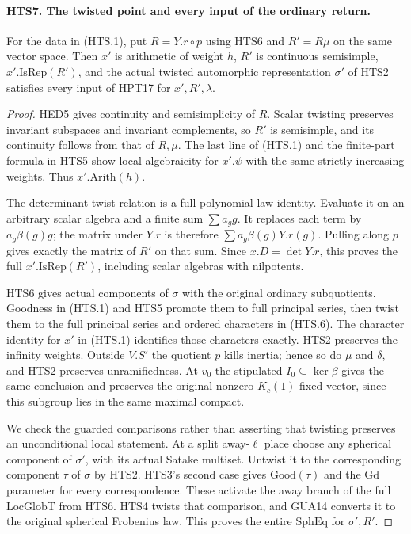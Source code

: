 \paragraph{HTS7. The twisted point and every input of the ordinary return.}
\label{claim:HTS7}
For the data in (HTS.1), put $R=Y.r\circ p$ using HTS6 and
$R'=R\mu$ on the same vector space.  Then $x'$ is arithmetic
of weight $h$, $R'$ is continuous semisimple,
$x'.\mathrm{IsRep}(R')$, and the actual twisted automorphic
representation $\sigma'$ of HTS2 satisfies every input of HPT17
for $x',R',\lambda$.
\begin{proof}
HED5 gives continuity and semisimplicity of $R$.  Scalar twisting
preserves invariant subspaces and invariant complements, so
$R'$ is semisimple, and its continuity follows from that of
$R,\mu$.  The last line of (HTS.1) and the finite-part formula
in HTS5 show local algebraicity for $x'.\psi$ with the same
strictly increasing weights.  Thus $x'.\mathrm{Arith}(h)$.

The determinant twist relation is a full polynomial-law identity.
Evaluate it on an arbitrary scalar algebra and a finite sum
$\sum a_g g$.  It replaces each term by
$a_g\beta(g)g$; the matrix under $Y.r$ is therefore
$\sum a_g\beta(g)Y.r(g)$.  Pulling along $p$ gives exactly
the matrix of $R'$ on that sum.  Since $x.D=\det Y.r$,
this proves the full $x'.\mathrm{IsRep}(R')$, including scalar
algebras with nilpotents.

HTS6 gives actual components of $\sigma$ with the original
ordinary subquotients.  Goodness in (HTS.1) and HTS5 promote
them to full principal series, then twist them to the full
principal series and ordered characters in (HTS.6).  The
character identity for $x'$ in (HTS.1) identifies those characters
exactly.  HTS2 preserves the infinity weights.  Outside $V.S'$
the quotient $p$ kills inertia; hence so do $\mu$ and $\delta$,
and HTS2 preserves unramifiedness.  At $v_0$ the stipulated
$I_0\subseteq\ker\beta$ gives the same conclusion and preserves
the original nonzero $K_c(1)$-fixed vector, since this subgroup
lies in the same maximal compact.

We check the guarded comparisons rather than asserting that
twisting preserves an unconditional local statement.  At a
split away-$\ell$ place choose any spherical component of
$\sigma'$, with its actual Satake multiset.  Untwist it to the
corresponding component $\tau$ of $\sigma$ by HTS2.
HTS3's second case gives $\mathrm{Good}(\tau)$ and the
$\mathrm{Gd}$ parameter for every correspondence.  These
activate the away branch of the full $\mathrm{LocGlobT}$ from
HTS6.  HTS4 twists that comparison, and GUA14 converts it to
the original spherical Frobenius law.  This proves the entire
$\mathrm{SphEq}$ for $\sigma',R'$.


\end{proof}

